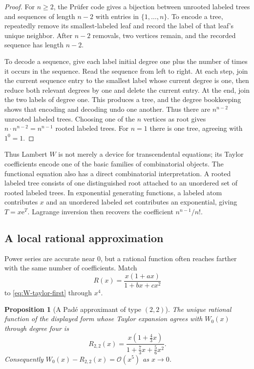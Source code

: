 \documentclass[11pt]{article}
\numberwithin{equation}{section}
\newtheorem{proposition}[theorem]{Proposition}
\theoremstyle{definition}
\theoremstyle{remark}
\newcommand{\e}{\mathrm e}
\begin{document}
\begin{proof}
For $n\ge2$, the Pr\"ufer code gives a bijection between unrooted labeled trees
and sequences of length $n-2$ with entries in $\{1,\ldots,n\}$.  To encode a
tree, repeatedly remove its smallest-labeled leaf and record the label of that
leaf's unique neighbor.  After $n-2$ removals, two vertices remain, and the
recorded sequence has length $n-2$.

To decode a sequence, give each label initial degree one plus the number of
times it occurs in the sequence.  Read the sequence from left to right.  At
each step, join the current sequence entry to the smallest label whose current
degree is one, then reduce both relevant degrees by one and delete the current
entry.  At the end, join the two labels of degree one.  This produces a tree,
and the degree bookkeeping shows that encoding and decoding undo one another.
Thus there are $n^{n-2}$ unrooted labeled trees.  Choosing one of the $n$
vertices as root gives $n\cdot n^{n-2}=n^{n-1}$ rooted labeled trees.  For
$n=1$ there is one tree, agreeing with $1^{0}=1$.
\end{proof}

Thus Lambert $W$ is not merely a device for transcendental equations; its
Taylor coefficients encode one of the basic families of combinatorial
objects.  The functional equation also has a direct combinatorial
interpretation.  A rooted labeled tree consists of one distinguished root
attached to an unordered set of rooted labeled trees.  In exponential
generating functions, a labeled atom contributes $x$ and an unordered labeled
set contributes an exponential, giving $T=x\e^T$.  Lagrange inversion then
recovers the coefficient $n^{n-1}/n!$.

\subsection{A local rational approximation}

Power series are accurate near $0$, but a rational function often reaches
farther with the same number of coefficients.  Match
\[
  R(x)=\frac{x(1+ax)}{1+bx+cx^2}
\]
to \eqref{eq:W-taylor-first} through $x^4$.

\begin{proposition}[A Pad\'e approximant of type $(2,2)$]
\label{prop:pade}
The unique rational function of the displayed form whose Taylor expansion
agrees with $W_0(x)$ through degree four is
\begin{equation}
  R_{2,2}(x)=
  \frac{x(1+\frac43x)}{1+\frac73x+\frac56x^2}.        \label{eq:pade22}
\end{equation}
Consequently $W_0(x)-R_{2,2}(x)=\mathcal O(x^5)$ as $x\to0$.
\end{proposition}
\end{document}
